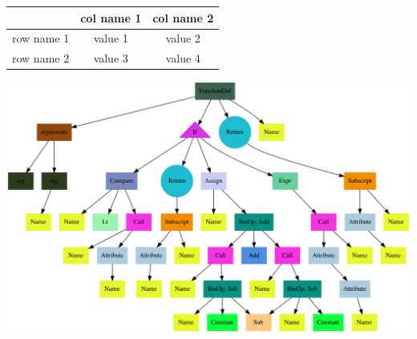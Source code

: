 \documentclass{article}
\begin{document}
\begin{table}
\begin{center}
\begin{tabular}
{ | c | c | c | }
\hline 
 & col name 1 & col name 2\\
\hline 
row name 1 & value 1 & value 2\\
\hline 
row name 2 & value 3 & value 4\\
\hline 
\end{tabular}
\end{center}
\end{table}
\begin{center}
\includegraphics[width = 15cm]{artifacts/ast.png}
\end{center}
\end{document}
